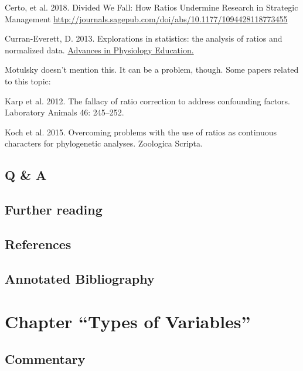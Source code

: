 \documentclass[]{book}
\theoremstyle{definition}
\theoremstyle{definition}
\theoremstyle{definition}
\theoremstyle{remark}
\begin{document}
Certo, et al. 2018. Divided We Fall: How Ratios Undermine Research in
Strategic Management
\url{http://journals.sagepub.com/doi/abs/10.1177/1094428118773455}

Curran-Everett, D. 2013. Explorations in statistics: the analysis of
ratios and normalized data.
\href{https://www.physiology.org/doi/abs/10.1152/advan.00053.2013}{Advances
in Physiology Education.}

Motulsky doesn't mention this. It can be a problem, though. Some papers
related to this topic:

Karp et al. 2012. The fallacy of ratio correction to address confounding
factors. Laboratory Animals 46: 245--252.

Koch et al. 2015. Overcoming problems with the use of ratios as
continuous characters for phylogenetic analyses. Zoologica Scripta.

\section{Q \& A}\label{q-a-1}

\section*{Further reading}\label{further-reading-5}

\section*{References}\label{references-5}

\section*{Annotated Bibliography}\label{annotated-bibliography-2}

\chapter{\texorpdfstring{Chapter ``Types of
Variables''}{Chapter Types of Variables}}\label{chapter-types-of-variables}

\section*{Commentary}\label{commentary-6}
\end{document}
